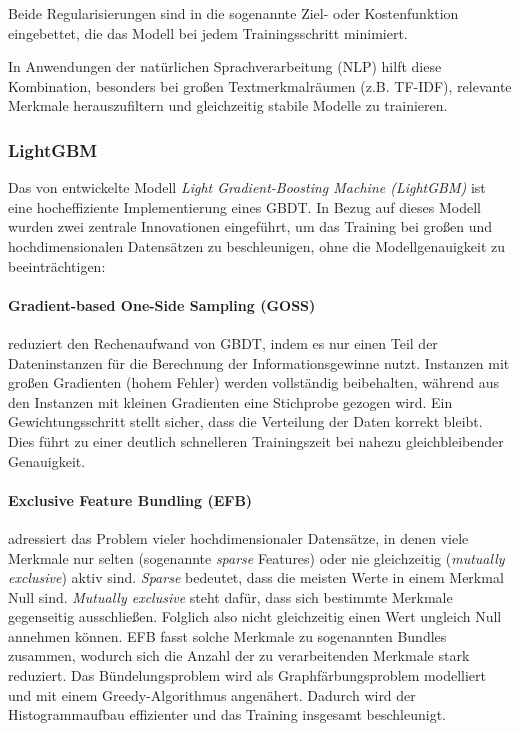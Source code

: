 Beide Regularisierungen sind in die sogenannte Ziel- oder Kostenfunktion eingebettet, die das Modell bei jedem Trainingsschritt minimiert. 

In Anwendungen der natürlichen Sprachverarbeitung (NLP) hilft diese Kombination, besonders bei großen Textmerkmalräumen (z.B. TF-IDF), 
relevante Merkmale herauszufiltern und gleichzeitig stabile Modelle zu trainieren\cite{chen2016xgboost}.

\subsubsection{LightGBM}

Das von \cite{ke2017} entwickelte Modell \textit{Light Gradient-Boosting Machine (LightGBM)} ist eine hocheffiziente Implementierung eines GBDT. 
In Bezug auf dieses Modell wurden zwei zentrale Innovationen eingeführt, um das Training bei großen und hochdimensionalen Datensätzen zu beschleunigen, 
ohne die Modellgenauigkeit zu beeinträchtigen:

\paragraph{Gradient-based One-Side Sampling (GOSS)} reduziert den Rechenaufwand von GBDT, indem es nur einen Teil der Dateninstanzen für die Berechnung 
der Informationsgewinne nutzt. Instanzen mit großen Gradienten (hohem Fehler) werden vollständig beibehalten, während aus den Instanzen mit kleinen 
Gradienten eine Stichprobe gezogen wird. Ein Gewichtungsschritt stellt sicher, dass die Verteilung der Daten korrekt bleibt. Dies führt zu einer
deutlich schnelleren Trainingszeit bei nahezu gleichbleibender Genauigkeit.

\paragraph{Exclusive Feature Bundling (EFB)} adressiert das Problem vieler hochdimensionaler Datensätze, in denen viele Merkmale nur selten 
(sogenannte \textit{sparse} Features) oder nie gleichzeitig (\textit{mutually exclusive}) aktiv sind. 
\textit{Sparse} bedeutet, dass die meisten Werte in einem Merkmal Null sind. \textit{Mutually exclusive} steht dafür, dass sich bestimmte Merkmale 
gegenseitig ausschließen. Folglich also nicht gleichzeitig einen Wert ungleich Null annehmen können. 
EFB fasst solche Merkmale zu sogenannten Bundles zusammen, wodurch sich die Anzahl der zu verarbeitenden Merkmale stark reduziert. 
Das Bündelungsproblem wird als Graphfärbungsproblem modelliert und mit einem Greedy-Algorithmus angenähert.
Dadurch wird der Histogrammaufbau effizienter und das Training insgesamt beschleunigt.

